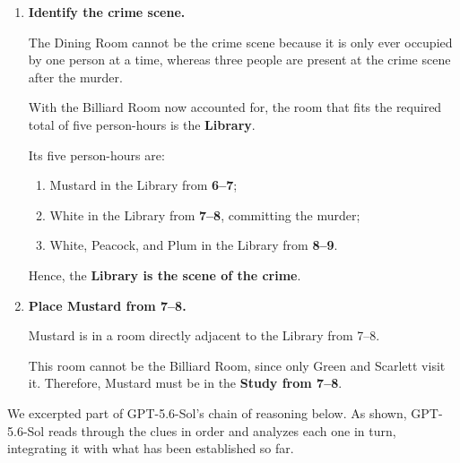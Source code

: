\begin{tcolorbox}
\begin{enumerate}[
    leftmargin=*,
    itemsep=1pt,
    topsep=2pt,
    parsep=0pt,
    partopsep=0pt
]
    Scarlett and Green are together from 7--9.

    They cannot be together in the Study, Hall, Lounge,
    Dining Room, Kitchen, or Ballroom, because those rooms
    are already occupied at the relevant times.

    They also cannot be in the Library:
    the Library is occupied for a total of five person-hours,
    whereas the room occupied by Scarlett and Green accounts
    for four person-hours.

    Therefore, Scarlett and Green must be together in the
    \textbf{Billiard Room from 7--9}.

    \item \textbf{Identify the crime scene.}

    The Dining Room cannot be the crime scene because it is only
    ever occupied by one person at a time, whereas three people
    are present at the crime scene after the murder.

    With the Billiard Room now accounted for, the room that fits
    the required total of five person-hours is the
    \textbf{Library}.

    Its five person-hours are:

    \begin{enumerate}[label=(\alph*), leftmargin=*, itemsep=2pt]
        \item Mustard in the Library from \textbf{6--7};
        \item White in the Library from \textbf{7--8},
        committing the murder;
        \item White, Peacock, and Plum in the Library from
        \textbf{8--9}.
    \end{enumerate}

    Hence, the \textbf{Library is the scene of the crime}.

    \item \textbf{Place Mustard from 7--8.}

    Mustard is in a room directly adjacent to the Library from 7--8.

    This room cannot be the Billiard Room, since only Green and
    Scarlett visit it. Therefore, Mustard must be in the
    \textbf{Study from 7--8}.

\end{enumerate}
\end{tcolorbox}

We excerpted part of GPT-5.6-Sol's chain of reasoning below. As shown, GPT-5.6-Sol reads through the clues in order and analyzes each one in turn, integrating it with what has been established so far.

